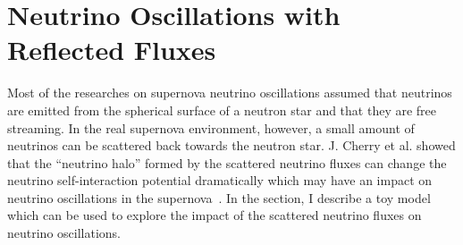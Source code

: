 










\section{\label{chap:halo}Neutrino Oscillations with Reflected Fluxes}

Most of the researches on supernova neutrino oscillations assumed that neutrinos are emitted from the spherical surface of a neutron star and that they are free streaming. In the real supernova environment, however, a small amount of neutrinos can be scattered back towards the neutron star. J. Cherry et al. showed that the ``neutrino halo'' formed by the scattered neutrino fluxes can change the neutrino self-interaction potential dramatically  which may have an impact on neutrino oscillations in the supernova~\cite{Cherry2012}. In the section, I describe a toy model which can be used to explore the impact of the scattered neutrino fluxes on neutrino oscillations.

